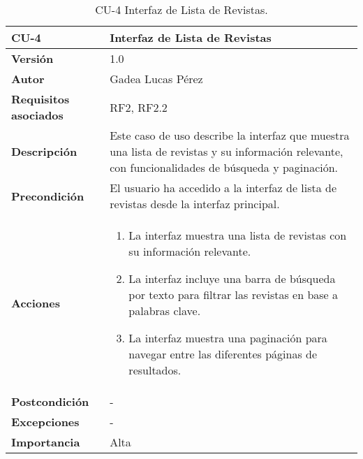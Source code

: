 \begin{table}[p]
\centering
\begin{tabularx}{\linewidth}{ p{} p{} }
\toprule
\textbf{CU-4} & \textbf{Interfaz de Lista de Revistas}\\
\toprule
\textbf{Versión} & 1.0 \\
\textbf{Autor} & Gadea Lucas Pérez \\
\textbf{Requisitos asociados} & RF2, RF2.2 \\
\textbf{Descripción} & Este caso de uso describe la interfaz que muestra una lista de revistas y su información relevante, con funcionalidades de búsqueda y paginación.\\
\textbf{Precondición} & El usuario ha accedido a la interfaz de lista de revistas desde la interfaz principal. \\
\textbf{Acciones} &
\begin{enumerate}
\def\labelenumi{\arabic{enumi}.}
\tightlist
\item La interfaz muestra una lista de revistas con su información relevante.
\item La interfaz incluye una barra de búsqueda por texto para filtrar las revistas en base a palabras clave.
\item La interfaz muestra una paginación para navegar entre las diferentes páginas de resultados.
\end{enumerate}\\
\textbf{Postcondición} & - \\
\textbf{Excepciones} & - \\
\textbf{Importancia} & Alta\\
\bottomrule
\end{tabularx}
\caption{CU-4 Interfaz de Lista de Revistas.}
\label{tab:cu4}
\end{table}



